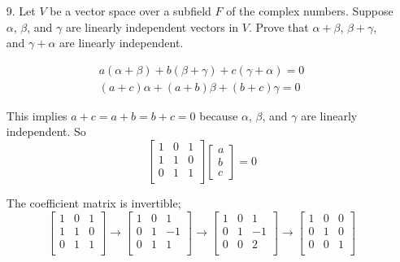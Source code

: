 \documentclass{article}
\begin{document}
\begin{enumerate}[listparindent=\parindent]
\item[9.] Let \(V\) be a vector space over a subfield \(F\) of the complex numbers.
    Suppose \(\alpha\), \(\beta\), and \(\gamma\) are linearly independent vectors in \(V\).
    Prove that \(\alpha + \beta\), \(\beta + \gamma\), and \(\gamma + \alpha\) are linearly independent.

    \begin{gather*}
    a(\alpha + \beta) + b(\beta + \gamma) + c(\gamma + \alpha) = 0\\
    (a + c)\alpha + (a + b)\beta + (b + c)\gamma = 0
    \end{gather*}

    This implies \(a + c = a + b = b + c = 0\) because \(\alpha\), \(\beta\), and \(\gamma\) are linearly independent.
    So
    \[
        \begin{bmatrix}
            1 & 0 & 1 \\
            1 & 1 & 0 \\
            0 & 1 & 1 \\
        \end{bmatrix}
        \begin{bmatrix}
            a \\ b \\ c
        \end{bmatrix}
        = 0
    \]

    The coefficient matrix is invertible;
    \[
        \begin{bmatrix}
            1 & 0 & 1 \\
            1 & 1 & 0 \\
            0 & 1 & 1 \\
        \end{bmatrix}
        \rightarrow
        \begin{bmatrix}
            1 & 0 & 1 \\
            0 & 1 & -1 \\
            0 & 1 & 1 \\
        \end{bmatrix}
        \rightarrow
        \begin{bmatrix}
            1 & 0 & 1 \\
            0 & 1 & -1 \\
            0 & 0 & 2 \\
        \end{bmatrix}
        \rightarrow
        \begin{bmatrix}
            1 & 0 & 0 \\
            0 & 1 & 0 \\
            0 & 0 & 1 \\
        \end{bmatrix}
    \]


\end{enumerate}
\end{document}
